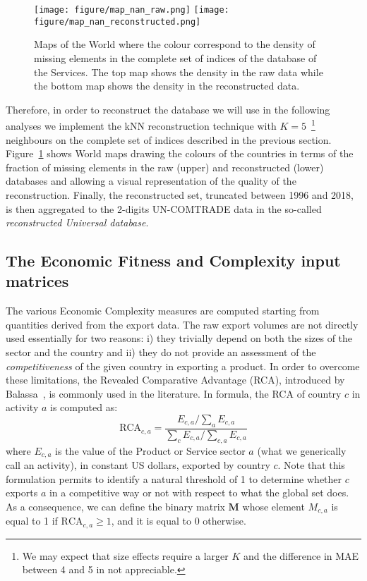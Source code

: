\documentclass[fleqn,10pt]{article}
\begin{document}
\begin{figure}[!h]
	\centering
	\texttt{[image: figure/map\_nan\_raw.png]}
	\texttt{[image: figure/map\_nan\_reconstructed.png]}
	\caption{Maps of the World where the colour correspond to the density of missing elements in the complete set of indices of the database of the Services. 
		The top map shows the density in the raw data while the bottom map shows the density in the reconstructed data.}
	\label{fig:maps_nan}
\end{figure}
Therefore, in order to reconstruct the database we will use in the following analyses we implement the kNN reconstruction technique with $K=5$~\footnote{We may expect that size effects require a larger $K$ and the difference in MAE between 4 and 5 in not appreciable.} neighbours on the complete set of indices described in the previous section.
Figure~\ref{fig:maps_nan} shows World maps drawing the colours of the countries in terms of the fraction of missing elements in the raw (upper) and reconstructed (lower) databases and allowing a visual representation of the quality of the reconstruction.
Finally, the reconstructed set, truncated between 1996 and 2018, is then aggregated to the 2-digits UN-COMTRADE data in the so-called \textit{reconstructed Universal database}.

\subsection*{The Economic Fitness and Complexity input matrices}
The various Economic Complexity measures are computed starting from quantities derived from the export data.
The raw export volumes are not directly used essentially for two reasons: i) they trivially depend on both the sizes of the sector and the country and ii) they do not provide an assessment of the \textit{competitiveness} of the given country in exporting a product. 
In order to overcome these limitations, the Revealed Comparative Advantage (RCA), introduced by Balassa~\cite{Balassa1965}, is commonly used in the literature. 
In formula, the RCA of country $c$ in activity $a$ is computed as:
\begin{equation}
	\mathrm{RCA}_{c,a}=\frac {E _{c,a}/\sum_a E _{c,a}}{\sum_c E _{c,a}/\sum_{c,a} E _{c,a}}
\end{equation}
where $E_{c,a}$ is the value of the Product or Service sector $a$ (what we generically call an activity), in constant US dollars, exported by country $c$. 
Note that this formulation permits to identify a natural threshold of 1 to determine whether $c$ exports $a$ in a competitive way or not with respect to what the global set does. 
As a consequence, we can define the binary matrix $\textbf{M}$ whose element $M_{c,a}$ is equal to 1 if $\mathrm{RCA}_{c,a} \ge 1$, and it is equal to 0 otherwise. 
\end{document}
